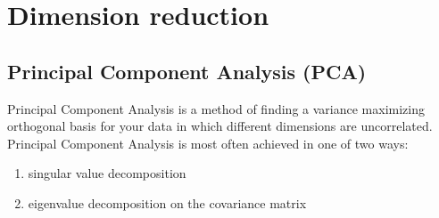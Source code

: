 \section{Dimension reduction}
\subsection{Principal Component Analysis (PCA)}
Principal Component Analysis is a method of finding a variance maximizing orthogonal basis for your data in which different dimensions are uncorrelated. Principal Component Analysis is most often achieved in one of two ways:
\begin{enumerate}
	\item singular value decomposition
	\item eigenvalue decomposition on the covariance matrix
\end{enumerate}


